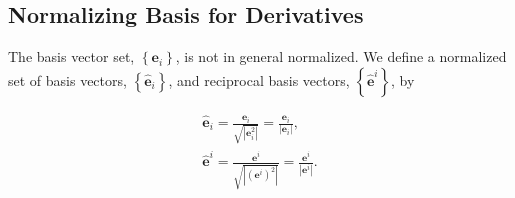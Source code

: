 \documentclass[12pt]{report}
\newcommand{\bm}[1]{\boldsymbol{#1}}
\newcommand{\bfrac}[2]{\displaystyle\frac{#1}{#2}}
\newcommand{\lp}{\left (}
\newcommand{\rp}{\right )}
\newcommand{\abs}[1]{\left |{#1}\right |}
\newcommand{\lbrc}{\left \{}
\newcommand{\rbrc}{\right \}}
\newcommand{\set}[1]{\lbrc {#1} \rbrc}
\newcommand{\paren}[1]{\lp {#1} \rp}
\begin{document}
\subsection{Normalizing Basis for Derivatives}

The basis vector set, $\set{\bm{e}_{i}}$, is not in general normalized.  We define a normalized set of basis
vectors, $\set{\bm{\hat{e}}_{i}}$, and reciprocal basis vectors, $\set{\bm{\hat{e}}^{i}}$, by

\begin{align}
  \bm{\hat{e}}_{i} = \bfrac{\bm{e}_{i}}{\sqrt{\abs{\bm{e}_{i}^{2}}}} = \bfrac{\bm{e}_{i}}{\abs{\bm{e}_{i}}}, \\
  \bm{\hat{e}}^{i} = \bfrac{\bm{e}^{i}}{\sqrt{\abs{\paren{\bm{e}^{i}}^{2}}}} = \bfrac{\bm{e}^{i}}{\abs{\bm{e}^{i}}}.
\end{align}
\end{document}
